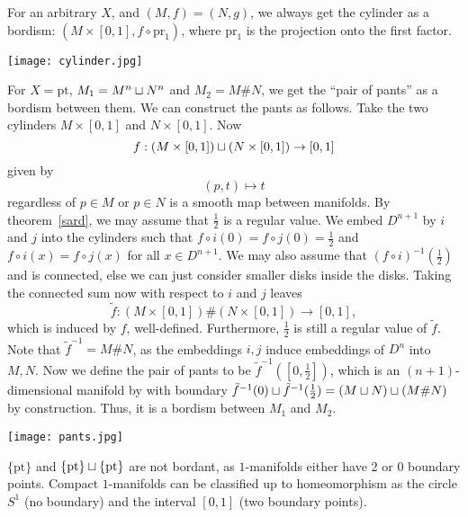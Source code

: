 \documentclass[a4paper,11pt]{article}
\begin{document}
\begin{example}[Cylinder]\label{cylinder bordism}
    For an arbitrary \(X\), and \((M,f)=(N,g)\), we always get the cylinder as a bordism: \((M\times[0,1],f\circ\mathrm{pr}_1)\), where \(\mathrm{pr}_1\) is the projection onto the first factor.
    \begin{center}
        \texttt{[image: cylinder.jpg]}
    \end{center}
\end{example}

\begin{example}\label{pants}
    For \(X=\mathrm{pt}\), \(M_1=M^n\sqcup N^n\) and \(M_2=M\# N\), we get the \enquote{pair of pants} as a bordism between them. We can construct the pants as follows. Take the two cylinders \(M\times [0,1]\) and \(N\times[0,1]\). Now \[f:(M\times[0,1])\sqcup(N\times[0,1])\to [0,1]\]
    given by
    \[(p,t)\mapsto t\] regardless of \(p\in M\) or \(p\in N\) is a smooth map between manifolds. By theorem\ \ref{sard}, we may assume that \(\frac12\) is a regular value. We embed \(D^{n+1}\) by \(i\) and \(j\) into the cylinders such that \(f\circ i(0)=f\circ j(0)=\frac12\) and \(f\circ i(x)=f\circ j(x)\) for all \(x\in D^{n+1}\). 
    We may also assume that \({(f\circ i)}^{-1}(\frac{1}{2})\) and is connected, else we can just consider smaller disks inside the disks. 
    Taking the connected sum now with respect to \(i\) and \(j\) leaves 
    \[\tilde f:(M\times[0,1])\#(N\times[0,1])\to[0,1],\]
    which is induced  by \(f\), well-defined. Furthermore, \(\frac12\) is still a regular value of \(\tilde f\). 
    Note that \(\tilde{f}^{-1}=M\#N\), as the embeddings \(i,j\) induce embeddings of \(D^n\) into \(M,N\). 
    Now we define the pair of pants to be \(\tilde{f}^{-1}([0,\frac12])\), which is an \((n+1)\)-dimensional manifold by with boundary \(\tilde f^{-1}(0)\sqcup\tilde f^{-1}(\frac12)=(M\sqcup N)\sqcup(M\#N)\) by construction. Thus, it is a bordism between \(M_1\) and \(M_2\).
    \begin{center}
        \texttt{[image: pants.jpg]}
    \end{center}
\end{example}

\begin{example}\label{points}
    \(\{\mathrm{pt}\}\) and \(\{\mathrm{pt}\}\sqcup\{\mathrm{pt}\}\) are not bordant, as \(1\)-manifolds either have 2 or 0 boundary points. Compact \(1\)-manifolds can be classified up to homeomorphism as the circle \(S^1\) (no boundary) and the interval \([0,1]\) (two boundary points). %
\end{example}
\end{document}
